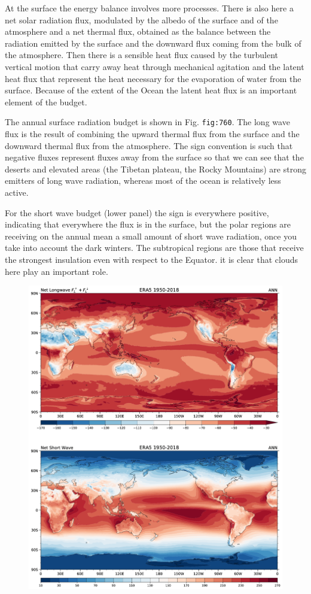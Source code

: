 At the surface the energy balance involves more processes. There is also
here a net solar radiation flux, modulated by the albedo of the surface
and of the atmosphere and a net thermal flux, obtained as the balance
between the radiation emitted by the surface and the downward flux
coming from the bulk of the atmosphere. Then there is a sensible heat
flux caused by the turbulent vertical motion that carry away heat
through mechanical agitation and the latent heat flux that represent the
heat necessary for the evaporation of water from the surface. Because of
the extent of the Ocean the latent heat flux is an important element of
the budget.

The annual surface radiation budget is shown in Fig. \texttt{fig:760}.
The long wave flux is the result of combining the upward thermal flux
from the surface and the downward thermal flux from the atmosphere. The
sign convention is such that negative fluxes represent fluxes away from
the surface so that we can see that the deserts and elevated areas (the
Tibetan plateau, the Rocky Mountains) are strong emitters of long wave
radiation, whereas most of the ocean is relatively less active.

For the short wave budget (lower panel) the sign is everywhere positive,
indicating that everywhere the flux is in the surface, but the polar
regions are receiving on the annual mean a small amount of short wave
radiation, once you take into account the dark winters. The subtropical
regions are those that receive the strongest insulation even with
respect to the Equator. it is clear that clouds here play an important
role.

\begin{figure}
\centering
\includegraphics[width = .7 \textwidth]{figs/GD/SrfRadANN.png}
\caption{} \label{fig:}
\end{figure}

